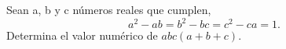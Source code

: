 Sean a, b y c números reales que cumplen,
\[a^2-ab=b^2-bc=c^2-ca=1.\]
Determina el valor numérico de $abc(a + b + c)$.